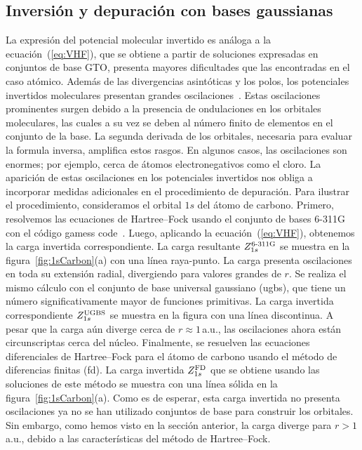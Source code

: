 \subsection{Inversión y depuración con bases gaussianas}
\label{subsec:invdepGTO}

La expresión del potencial molecular invertido es análoga a la
ecuación~(\ref{eq:VHF}), que se obtiene a partir de soluciones expresadas
en conjuntos de base GTO, presenta mayores dificultades que las encontradas
en el caso atómico. Además de las divergencias asintóticas y los polos, 
los potenciales invertidos moleculares presentan grandes 
oscilaciones~\cite{Schipper:97,Mura:97,Jacob:11,Gaiduk:13}. 
Estas oscilaciones prominentes surgen debido a la presencia de 
ondulaciones en los orbitales moleculares, las cuales a su vez se deben 
al número finito de elementos en el conjunto de la base. La segunda
derivada de los orbitales, necesaria para evaluar la formula inversa,
amplifica estos rasgos. En algunos casos, las oscilaciones son enormes;
por ejemplo, cerca de átomos electronegativos como el cloro. La 
aparición de estas oscilaciones en los potenciales invertidos nos obliga
a incorporar medidas adicionales en el procedimiento de depuración.
Para ilustrar el procedimiento, consideramos el orbital $1s$ del
átomo de carbono. Primero, resolvemos las ecuaciones de Hartree--Fock 
usando el conjunto de bases \mbox{6-311G} con el código {\sc gamess} code~\cite{Schmidt:93,Gordon:05}. Luego, aplicando la ecuación~(\ref{eq:VHF}),
obtenemos la carga invertida correspondiente. La carga resultante
$Z_{1s}^{\mbox{\scriptsize 6-311G}}$ se muestra en la 
figura~\ref{fig:1sCarbon}(a) con una línea raya-punto. La carga presenta
oscilaciones en toda su extensión radial, divergiendo para valores 
grandes de $r$. Se realiza el mismo cálculo con el conjunto de base 
universal gaussiano (\acs{ugbs}), que tiene un número significativamente 
mayor de funciones primitivas. La carga invertida correspondiente 
$Z_{1s}^{\mbox{\scriptsize UGBS}}$ se muestra en la figura con una línea 
discontinua. A pesar que la carga aún diverge cerca de $r\approx1\,$a.u., 
las oscilaciones ahora están circunscriptas cerca del núcleo. Finalmente,
se resuelven las ecuaciones diferenciales de Hartree--Fock para el 
átomo de carbono usando el método de diferencias finitas (\acs{fd}). La
carga invertida $Z_{1s}^{\mbox{\scriptsize FD}}$ que se obtiene usando 
las soluciones de este método se muestra con una línea sólida en la 
figura~\ref{fig:1sCarbon}(a). Como es de esperar, esta carga invertida 
no presenta oscilaciones ya no se han utilizado conjuntos de base para
construir los orbitales. Sin embargo, como hemos visto en la sección
anterior, la carga diverge para $r>1\,$a.u., debido a las características
del método de Hartree--Fock.

